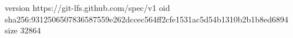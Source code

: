 version https://git-lfs.github.com/spec/v1
oid sha256:9312506507836587559e262dccec564ff2cfe1531ac5d54b1310b2b1b8ed6894
size 32864
